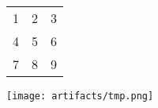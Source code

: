 \documentclass{article}
\begin{document}
\begin{tabular}{c|c|c}
1 & 2 & 3\\
4 & 5 & 6\\
7 & 8 & 9\\
\end{tabular}
\texttt{[image: artifacts/tmp.png]}
\end{document}

